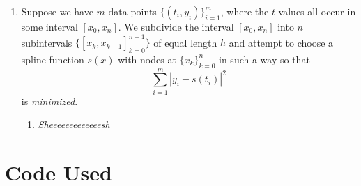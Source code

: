 \documentclass[a4paper,12pt]{article}
\newcommand{\abs}[1]{\left| #1 \right|}
\begin{document}
\begin{enumerate}[label = \arabic*.]
\begin{enumerate}[label = (\roman*)]
			We know $ p(x) $ has the form
			\[
				p(x) = a_0 + a_1 x + a_2 x^2 + a_3 x^3
			\]
			for some constants $ a_0, a_1, a_2, $ and $ a_3 $. Then, using our second derivative information, we have
			\[
				p''(x_1) = 2 a_2 + 6a_3 x_1 = f''(x_1)
			\]
			which implies 
			\[
				a_2 = \frac{1}{2} f''(x_1) - 3 a_3 x_1.
			\]
			Then, using our first derivative information, we have
			\[
				p'(x_1) = a_1 + 2\left(\frac{1}{2} f''(x_1) - 3a_3 x_1\right) x_1 + 3a_3 x_1^2 = f'(x_1)
			\]
			which implies 
			\[
				a_1 = f'(x_1) - f''(x_1)x_1 + 3 a_3 x_1^2.
			\]
			Next, we can use our function information to get the system
			\begin{align*}
				p(x_0) &= a_0 + f'(x_1)x_0 - f''(x_1) x_0 x_1 + 3a_3 x_0 x_1^2 + \frac{1}{2} f''(x_1)x_0^2 - 3a_3 x_0^2 x_1 + a_3 x_0^3 = f(x_0) \\
				p(x_2) &= a_0 + f'(x_1)x_2 - f''(x_1) x_1 x_2 + 3a_3 x_1^2 x_2 + \frac{1}{2} f''(x_1)x_2^2 - 3a_3 x_1 x_2^2 + a_3 x_2^3 = f(x_2)
				\shortintertext{which implies}
				a_3 &= \frac{f(x_2) - f(x_0) + f'(x_1)(x_0 - x_2) - f''(x_1) x_1(x_0 - x_2) + \frac{1}{2} f''(x_1) (x_0^2 - x_2^2)}{3 x_1^2 (x_2 - x_0) + 3x_1 (x_0^2 - x_2^2) + x_2^3 - x_0^3} \\
				a_0 &= f(x_0) - f'(x_1)x_0 + f''(x_1) x_0 x_1 + 3a_3 x_0 x_1^2 - \frac{1}{2} f''(x_1)x_0^2 + 3a_3 x_0^2 x_1 - a_3 x_0^3.
			\end{align*}
			Now, we construct our polynomial by first computing $ a_3, a_0, a_1, $ and $ a_2 $ in that order and then plugging them into our polynomial
			\[
				p(x) = a_0 + a_1 x + a_2 x^2 + a_3 x^3.
			\]
			
			
			\item Let $ x_0 = -1, x_1 = 0, $ and $ x_2 = 1 $. Assuming $ f(x) \in C^4[-1,1] $, show that for $ x \in [-1,1] $,
			\[
				f(x) - p(x) = \frac{x^4 - 1}{4!}f^4(\eta_x)
			\]
			for some $ \eta_x \in [-1,1] $.
		\end{enumerate}
	
	\item Suppose we have $ m $ data points $ \{(t_i, y_i)\}_{i = 1}^m $, where the $ t $-values all occur in some interval $ [x_0, x_n] $. We subdivide the interval $ [x_0, x_n] $ into $ n $ subintervals $ \{[x_k, x_{k + 1}]_{k = 0}^{n - 1}\} $ of equal length $ h $ and attempt to choose a spline function $ s(x) $ with nodes at $ \{x_k\}_{k = 0}^n $ in such a way so that
	\[
		\sum_{i = 1}^{m} \abs{y_i - s(t_i)}^2
	\]
	is \emph{minimized}.
		\begin{enumerate}[label = (\roman*)]
			\item \emph{Sheeeeeeeeeeeeesh}
		\end{enumerate}
\end{enumerate}

\section*{Code Used}
\end{document}
